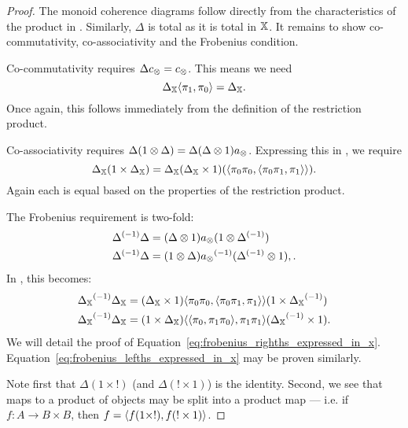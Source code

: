 \begin{proof}
  The monoid coherence diagrams follow directly from the characteristics of the product in
  \X. Similarly, $\Delta$ is total as it is total in $\mathbb{X}$. It remains to show co-commutativity,
  co-associativity and the Frobenius condition.

  Co-commutativity requires $\Delta c_{\otimes} = c_{\otimes}$. This means we need
  \[\Delta_{\mathbb{X}} \langle \pi_1,\pi_0\rangle = \Delta_{\mathbb{X}}.\] Once again, this follows immediately from the
  definition of the restriction product.

  Co-associativity requires $\Delta (1 \otimes \Delta) = \Delta (\Delta \otimes 1) a_{\otimes}$. Expressing this
  in \X, we require
  \[
    \Delta_{\mathbb{X}} (1 \times \Delta_{\mathbb{X}}) =
      \Delta_{\mathbb{X}}(\Delta_{\mathbb{X}} \times 1) (\langle\pi_0 \pi_0,\langle\pi_0 \pi_1,\pi_1\rangle\rangle).
  \]
  Again each is equal based on the properties of the restriction product.

  The Frobenius requirement is two-fold:
  \begin{align}
    {\Delta}^{(-1)} \Delta &= (\Delta \otimes1) a_{\otimes}(1\otimes{\Delta}^{(-1)}) \label{eq:frobenius_righths_need_in_invx}\\
    {\Delta}^{(-1)} \Delta &= (1 \otimes \Delta) {a_{\otimes}}^{(-1)}({\Delta}^{(-1)}\otimes 1), \label{eq:frobenius_lefths_need_in_invx}.
  \end{align}
  In \X, this becomes:
  \begin{align}
    {\Delta_{\ensuremath{\mathbb{X}}}}^{(-1)} \Delta_{\mathbb{X}}
      &= (\Delta_{\mathbb{X}} \times 1) \langle\pi_0 \pi_0,\langle\pi_0 \pi_1,\pi_1\rangle\rangle(1\times{\Delta_{\ensuremath{\mathbb{X}}}}^{(-1)})
      \label{eq:frobenius_righths_expressed_in_x}\\
    {\Delta_{\mathbb{X}}}^{(-1)}\Delta_{\mathbb{X}}
      &= (1 \times \Delta_{\mathbb{X}}) \langle\langle\pi_0, \pi_1 \pi_0\rangle,\pi_1 \pi_1\rangle({\Delta_{\mathbb{X}}}^{(-1)}\times 1).
      \label{eq:frobenius_lefths_expressed_in_x}
  \end{align}
  We will detail the proof of Equation~\ref{eq:frobenius_righths_expressed_in_x}.
  Equation~\ref{eq:frobenius_lefths_expressed_in_x} may be proven similarly.

  Note first that $\Delta(1 \times !)$ (and $\Delta(!\times 1)$) is the identity. Second, we see
  that maps to a product of objects may be split into a product map --- i.e.  if
  $f:A \to B \times B$, then $f = \langle f(1\times !), f(!\times 1)\rangle$.


\end{proof}

